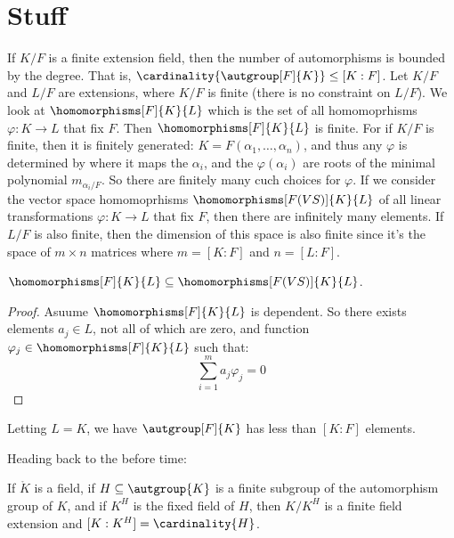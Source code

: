 \documentclass{article}                                                        %
\begin{document}
    \section{Stuff}
        If $K/F$ is a finite extension field, then the number of automorphisms
        is bounded by the degree. That is,
        $\cardinality{\autgroup[F]{K}}\leq[K:F]$. Let $K/F$ and $L/F$ are
        extensions, where $K/F$ is finite (there is no constraint on $L/F$). We
        look at $\homomorphisms[F]{K}{L}$ which is the set of all homomoprhisms
        $\varphi:K\rightarrow{L}$ that fix $F$. Then $\homomorphisms[F]{K}{L}$
        is finite. For if $K/F$ is finite, then it is finitely generated:
        $K=F(\alpha_{1},\dots,\alpha_{n})$, and thus any $\varphi$ is determined
        by where it maps the $\alpha_{i}$, and the $\varphi(\alpha_{i})$ are
        roots of the minimal polynomial $m_{\alpha_{i}/F}$. So there are
        finitely many cuch choices for $\varphi$. If we consider the vector
        space homomoprhisms $\homomorphisms[F(VS)]{K}{L}$ of all linear
        transformations $\varphi:K\rightarrow{L}$ that fix $F$, then there are
        infinitely many elements. If $L/F$ is also finite, then the dimension
        of this space is also finite since it's the space of $m\times{n}$
        matrices where $m=[K:F]$ and $n=[L:F]$.
        \begin{theorem}
            $\homomorphisms[F]{K}{L}\subseteq\homomorphisms[F(VS)]{K}{L}$.
        \end{theorem}
        \begin{proof}
            Asuume $\homomorphisms[F]{K}{L}$ is dependent. So there exists
            elements $a_{j}\in{L}$, not all of which are zero, and function
            $\varphi_{j}\in\homomorphisms[F]{K}{L}$ such that:
            \begin{equation}
                \sum_{i=1}^{m}a_{j}\varphi_{j}=0
            \end{equation}
        \end{proof}
        \begin{theorem}
            Letting $L=K$, we have $\autgroup[F]{K}$ has less than $[K:F]$
            elements.
        \end{theorem}
        Heading back to the before time:
        \begin{theorem}
            If $\ring{K}$ is a field, if $H\subseteq\autgroup{K}$ is a finite
            subgroup of the automorphism group of $K$, and if $K^{H}$ is the
            fixed field of $H$, then $K/K^{H}$ is a finite field extension and
            $[K:K^{H}]=\cardinality{H}$.
        \end{theorem}
\end{document}
